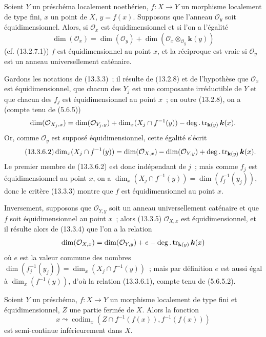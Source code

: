 \begin{proposition}[13.3.6]
\label{IV.13.3.6-fr}
Soient $Y$ un préschéma localement noethérien, $f:X\to Y$ un morphisme
localement de type fini, $x$ un point de $X$, $y=f(x)$. Supposons que l'anneau
$\mathcal O_y$ soit équidimensionnel. Alors, si $\mathcal O_x$ est
équidimensionnel et si l'on a l'égalité
\[
\tag{13.3.6.1}
\label{IV.13.3.6.1-fr}
  \dim(\mathcal O_x)=\dim(\mathcal O_y)
  +\dim(\mathcal O_x\otimes_{\mathcal O_y}\boldsymbol{k}(y))
\]
\textup{(cf. (13.2.7.1))} $f$ est équidimensionnel au point $x$, et la réciproque est
vraie si $\mathcal O_y$ est un anneau universellement caténaire.
\end{proposition}

Gardons les notations de (13.3.3)~; il résulte de (13.2.8) et de l'hypothèse
que $\mathcal O_x$ est équidimensionnel, que chacun des $Y_j$ est une
composante irréductible de $Y$ et que chacun des $f_j$ est équidimensionnel au
point $x$~; en outre (13.2.8), on a (compte tenu de (5.6.5))
\[
  \dim(\mathcal O_{X_j,x})=\dim(\mathcal O_{Y_j,y})
  +\dim_x(X_j\cap f^{-1}(y))-\deg.\operatorname{tr}_{\mathbf{k}(y)}\boldsymbol{k}(x).
\]
Or, comme $\mathcal O_y$ est supposé équidimensionnel, cette égalité s'écrit
\[
\tag{13.3.6.2}
\label{IV.13.3.6.2-fr}
  \dim_x(X_j\cap f^{-1}(y))=\dim(\mathcal O_{X,x})
  -\dim(\mathcal O_{Y,y})+\deg.\operatorname{tr}_{\mathbf{k}(y)}\boldsymbol{k}(x).
\]
Le premier membre de (13.3.6.2) est donc indépendant de $j$~; mais comme $f_j$
est équidimensionnel au point $x$, on a
$\dim_x(X_j\cap f^{-1}(y))=\dim(f_j^{-1}(y_j))$, donc le critère (13.3.3)
montre que $f$ est équidimensionnel au point $x$.

Inversement, supposons que $\mathcal O_{Y,y}$ soit un anneau universellement
caténaire et que $f$ soit équidimensionnel au point $x$~; alors (13.3.5)
$\mathcal O_{X,x}$ est équidimensionnel, et il résulte alors de (13.3.4) que
l'on a la relation
\[
  \dim(\mathcal O_{X,x})=\dim(\mathcal O_{Y,y})+e
  -\deg.\operatorname{tr}_{\mathbf{k}(y)}\boldsymbol{k}(x)
\]
où $e$ est la valeur commune des nombres
$\dim(f_j^{-1}(y_j))=\dim_x(X_j\cap f^{-1}(y))$~; mais par définition $e$ est
aussi égal à $\dim_x(f^{-1}(y))$, d'où la relation (13.3.6.1), compte tenu de
(5.6.5.2).

\begin{proposition}[13.3.7]
\label{IV.13.3.7-fr}
Soient $Y$ un préschéma, $f:X\to Y$ un morphisme localement de type fini et
équidimensionnel, $Z$ une partie fermée de $X$. Alors la fonction
\[
\tag{13.3.7.1}
\label{IV.13.3.7.1-fr}
  x\leadsto\operatorname{codim}_x
  (Z\cap f^{-1}(f(x)),f^{-1}(f(x)))
\]
est semi-continue inférieurement dans $X$.
\end{proposition}

